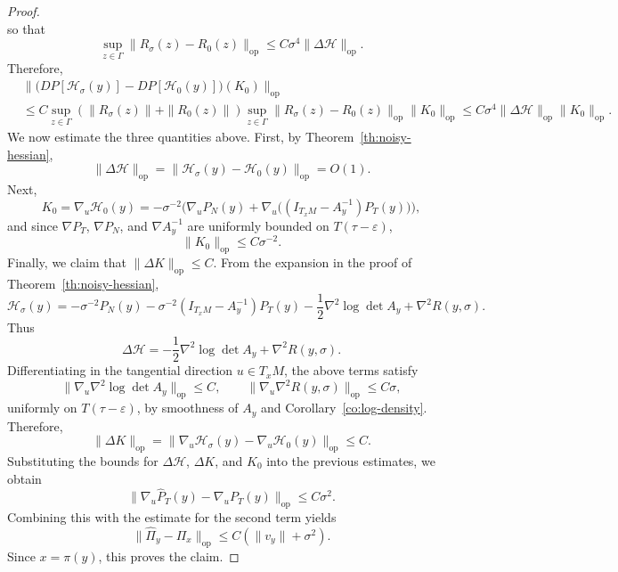\documentclass[10pt,a4paper]{amsart}
\begin{document}
\begin{proof}
\[\]
so that
\[
\sup_{z\in\Gamma}\|R_\sigma(z)-R_0(z)\|_{\mathrm{op}}
\le
C\sigma^4\|\Delta \mathcal H\|_{\mathrm{op}}.
\]
Therefore,
\begin{align*}
&\big\|
\big(DP[\mathcal H_\sigma(y)]-DP[\mathcal H_0(y)]\big)(K_0)
\big\|_{\mathrm{op}}\\
&\le
C\sup_{z\in\Gamma}(\|R_\sigma(z)\|+\|R_0(z)\|)\sup_{z\in\Gamma}\|R_\sigma(z)-R_0(z)\|_{\mathrm{op}}\|K_0\|_{\mathrm{op}}
\le
C\sigma^4\|\Delta \mathcal H\|_{\mathrm{op}}\|K_0\|_{\mathrm{op}}.
\end{align*}
We now estimate the three quantities above. First, by Theorem~\ref{th:noisy-hessian},
\[
\|\Delta \mathcal H\|_{\mathrm{op}}
=
\|\mathcal H_\sigma(y)-\mathcal H_0(y)\|_{\mathrm{op}}
=
O(1).
\]
Next,
\[
K_0
=
\nabla_u\mathcal H_0(y)
=
-\sigma^{-2}\Big(\nabla_uP_N(y)+\nabla_u \big((I_{T_xM}-A_y^{-1})P_T(y)\big)\Big),
\]
and since $\nabla P_T$, $\nabla P_N$, and $\nabla A_y^{-1}$ are uniformly bounded on $T(\tau-\varepsilon)$,
\[
\|K_0\|_{\mathrm{op}}\le C\sigma^{-2}.
\]
Finally, we claim that $\|\Delta K\|_{\mathrm{op}} \le C$. From the expansion in the proof of
Theorem~\ref{th:noisy-hessian},
\[
\mathcal H_\sigma(y)
=
-\sigma^{-2}P_N(y)
-\sigma^{-2}(I_{T_xM}-A_y^{-1})P_T(y)
-\frac12\nabla^2\log\det A_y
+\nabla^2R(y,\sigma).
\]
Thus
\[
\Delta \mathcal H 
=
-\frac12\nabla^2\log\det A_y
+\nabla^2R(y,\sigma).
\]
Differentiating in the tangential direction $u\in T_xM$, the above terms satisfy
\[
\|\nabla_u\nabla^2\log\det A_y\|_{\mathrm{op}} \le C,
\qquad
\|\nabla_u\nabla^2R(y,\sigma)\|_{\mathrm{op}} \le C\sigma,
\]
uniformly on $T(\tau-\varepsilon)$, by smoothness of $A_y$ and
Corollary~\ref{co:log-density}. Therefore,
\[
\|\Delta K\|_{\mathrm{op}}
=
\|\nabla_u\mathcal H_\sigma(y)-\nabla_u\mathcal H_0(y)\|_{\mathrm{op}}
\le C.
\]
Substituting the bounds for $\Delta \mathcal H$, $\Delta K$, and $K_0$ into the previous estimates, we obtain
\[
\|\nabla_u\widehat P_T(y)-\nabla_uP_T(y)\|_{\mathrm{op}}
\le C\sigma^2.
\]
Combining this with the estimate for the second term yields
\[
\|\widehat\Pi_y-\Pi_x\|_{\mathrm{op}}
\le
C(\|v_y\|+\sigma^2).
\]
Since $x=\pi(y)$, this proves the claim.
\end{proof}
\end{document}
